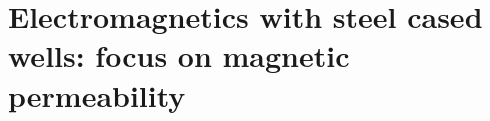 

\chapter{Electromagnetics with steel cased wells: focus on magnetic permeability}
\label{ch:casing_em_permeability}
